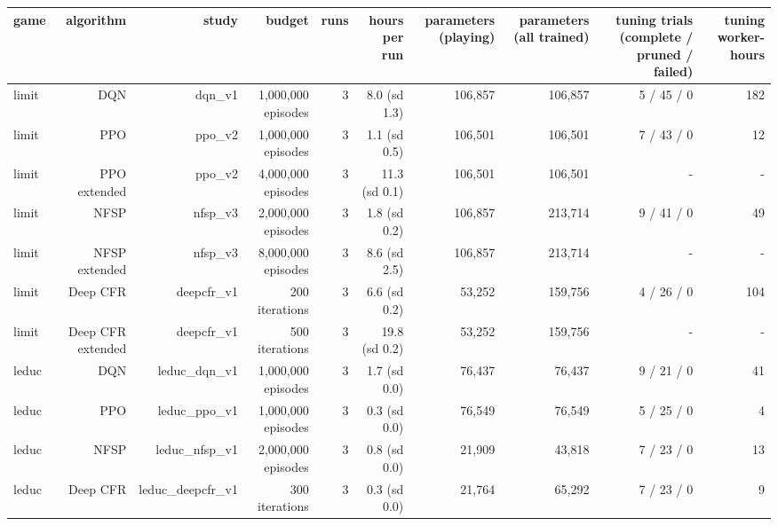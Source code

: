 \begin{tabular}{lrrrrrrrrr}
\toprule
game & algorithm & study & budget & runs & hours per run & parameters (playing) & parameters (all trained) & tuning trials (complete / pruned / failed) & tuning worker-hours \\
\midrule
limit & DQN & dqn\_v1 & 1,000,000 episodes & 3 & 8.0 (sd 1.3) & 106,857 & 106,857 & 5 / 45 / 0 & 182 \\
limit & PPO & ppo\_v2 & 1,000,000 episodes & 3 & 1.1 (sd 0.5) & 106,501 & 106,501 & 7 / 43 / 0 & 12 \\
limit & PPO extended & ppo\_v2 & 4,000,000 episodes & 3 & 11.3 (sd 0.1) & 106,501 & 106,501 & - & - \\
limit & NFSP & nfsp\_v3 & 2,000,000 episodes & 3 & 1.8 (sd 0.2) & 106,857 & 213,714 & 9 / 41 / 0 & 49 \\
limit & NFSP extended & nfsp\_v3 & 8,000,000 episodes & 3 & 8.6 (sd 2.5) & 106,857 & 213,714 & - & - \\
limit & Deep CFR & deepcfr\_v1 & 200 iterations & 3 & 6.6 (sd 0.2) & 53,252 & 159,756 & 4 / 26 / 0 & 104 \\
limit & Deep CFR extended & deepcfr\_v1 & 500 iterations & 3 & 19.8 (sd 0.2) & 53,252 & 159,756 & - & - \\
leduc & DQN & leduc\_dqn\_v1 & 1,000,000 episodes & 3 & 1.7 (sd 0.0) & 76,437 & 76,437 & 9 / 21 / 0 & 41 \\
leduc & PPO & leduc\_ppo\_v1 & 1,000,000 episodes & 3 & 0.3 (sd 0.0) & 76,549 & 76,549 & 5 / 25 / 0 & 4 \\
leduc & NFSP & leduc\_nfsp\_v1 & 2,000,000 episodes & 3 & 0.8 (sd 0.0) & 21,909 & 43,818 & 7 / 23 / 0 & 13 \\
leduc & Deep CFR & leduc\_deepcfr\_v1 & 300 iterations & 3 & 0.3 (sd 0.0) & 21,764 & 65,292 & 7 / 23 / 0 & 9 \\
\bottomrule
\end{tabular}
